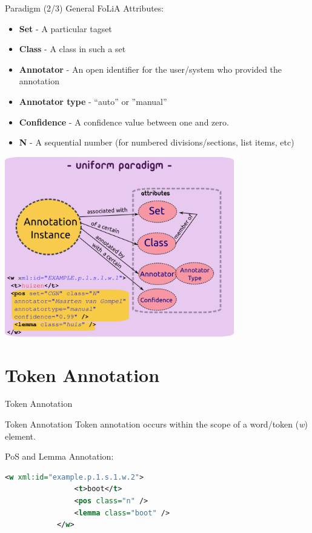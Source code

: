 \documentclass[compress]{beamer}
\begin{document}
\begin{frame}
    \begin{block}{Paradigm (2/3)}
        General FoLiA Attributes:
        \begin{itemize}
            \item \textbf{Set} - A particular tagset
            \item \textbf{Class} - A class in such a set
            \item \textbf{Annotator} - An open identifier for the user/system who provided the annotation
            \item \textbf{Annotator type} - ``auto'' or ''manual''
            \item \textbf{Confidence} - A confidence value between one and zero.
            \item \textbf{N} - A sequential number (for numbered divisions/sections, list items, etc)            
        \end{itemize}
            
    \end{block}
\end{frame}

\begin{frame}
        \begin{center}
        \includegraphics[width=100.0mm]{paradigm.png}
        \end{center}
\end{frame}


\section{Token Annotation}

\begin{frame}{Token Annotation}
    \begin{block}{Token Annotation}
        Token annotation occurs within the scope of a word/token (\emph{w}) element.
    \end{block}
    \begin{example}
       PoS and Lemma Annotation:
      \begin{lstlisting}[language=xml]
            <w xml:id="example.p.1.s.1.w.2">
                <t>boot</t>
                <pos class="n" />
                <lemma class="boot" />
            </w>                         
      \end{lstlisting}        
    \end{example}
\end{frame}
\end{document}
